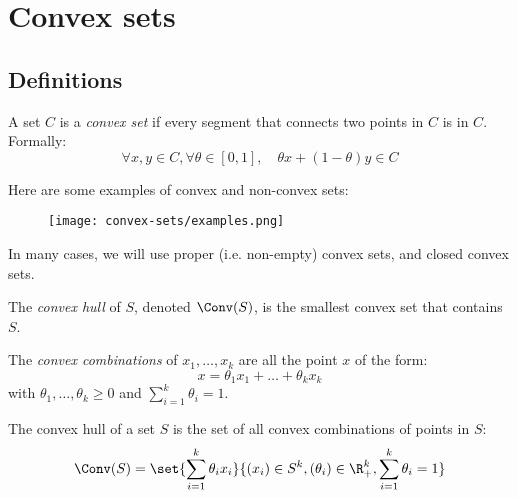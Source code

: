 \section{Convex sets}
\subsection{Definitions}
\begin{definition}
    A set $C$ is a \emph{convex set} if every segment that connects two points in $C$ is in $C$. Formally:
    \begin{equation*}
        \forall x, y \in C, \forall \theta \in [0, 1], \quad \theta x + (1 - \theta) y \in C
    \end{equation*}
\end{definition}

\begin{example}
    Here are some examples of convex and non-convex sets:
    \begin{figure}[H]
        \centering
        \texttt{[image: convex-sets/examples.png]}
    \end{figure}
\end{example}
In many cases, we will use proper (i.e. non-empty) convex sets, and closed convex sets.

\begin{definition}
    The \emph{convex hull} of $S$, denoted $\Conv(S)$, is the smallest convex set that contains $S$.
\end{definition}

\begin{definition}
    The \emph{convex combinations} of $x_1, \dots, x_k$ are all the point $x$ of the form:
    \begin{equation*}
        x = \theta_1x_1 + \dots + \theta_kx_k
    \end{equation*}
    with $\theta_1, \dots, \theta_k \geq 0$ and $\sum_{i=1}^k\theta_i = 1$.
\end{definition}

\begin{property}
    The convex hull of a set $S$ is the set of all convex combinations of points in $S$:
    \begin{equation*}
        \Conv(S) = \set{\sum_{i=1}^k\theta_ix_i}{(x_i)\in S^k, (\theta_i)\in\R_+^k, \sum_{i=1}^k\theta_i = 1}
    \end{equation*}
\end{property}

